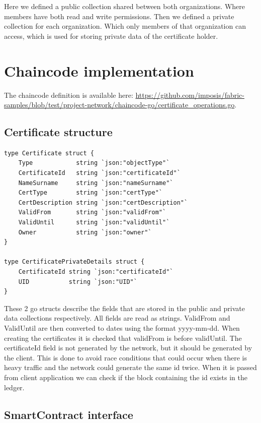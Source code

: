 \documentclass[12pt]{article}
\begin{document}
Here we defined a public collection shared between both organizations. Where members have both read and write permissions.
Then we defined a private collection for each organization. Which only members of that organization can access, which is used for storing private data of the certificate holder.

\newpage

\section{Chaincode implementation}
The chaincode definition is available here: \url{https://github.com/imposis/fabric-samples/blob/test/project-network/chaincode-go/certificate_operations.go}.

\subsection{Certificate structure}

\begin{lstlisting}[language=Golang]
type Certificate struct {
	Type            string `json:"objectType"`
	CertificateId   string `json:"certificateId"`
	NameSurname     string `json:"nameSurname"`
	CertType        string `json:"certType"`
	CertDescription string `json:"certDescription"`
	ValidFrom       string `json:"validFrom"`
	ValidUntil      string `json:"validUntil"`
	Owner           string `json:"owner"`
}

type CertificatePrivateDetails struct {
	CertificateId string `json:"certificateId"`
	UID           string `json:"UID"`
}
\end{lstlisting}

These 2 go structs describe the fields that are stored in the public and private data collections respectively. All fields are read as strings.
ValidFrom and ValidUntil are then converted to dates using the format yyyy-mm-dd.
When creating the certificates it is checked that validFrom is before validUntil.
The certificateId field is not generated by the network, but it should be generated by the client.
This is done to avoid race conditions that could occur when there is heavy traffic and the network could generate the same id twice.
When it is passed from client application we can check if the block containing the id exists in the ledger.

\subsection{SmartContract interface}
\end{document}
